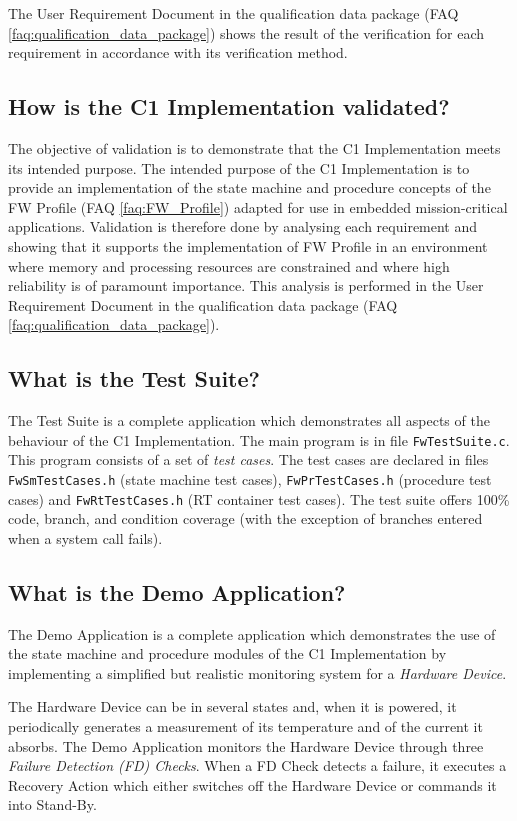 \documentclass[faq]{../fwprofile}
\begin{document}
The User Requirement Document in the qualification data package (FAQ \ref{faq:qualification_data_package}) shows 
the result of the verification for each requirement in accordance with its verification method. 

\subsection{How is the C1 Implementation validated?}
The objective of validation is to demonstrate that the C1 Implementation meets its intended purpose. The intended purpose of the C1 Implementation 
is to provide an implementation of the state machine and procedure concepts of the FW Profile (FAQ \ref{faq:FW_Profile}) adapted for use in 
embedded mission-critical applications. Validation is therefore done by analysing each requirement and showing that it supports the implementation 
of FW Profile in an environment where memory and processing resources are constrained and where high reliability is of paramount importance. 
This analysis is performed in the User Requirement Document in the qualification data package (FAQ \ref{faq:qualification_data_package}).

\subsection{What is the Test Suite?}\label{faq:test_suite}
The Test Suite is a complete application which demonstrates all aspects of the behaviour of the C1 Implementation. 
The main program is in file \texttt{FwTestSuite.c}. This program consists of a set of \emph{test cases}. The test cases are declared 
in files \texttt{FwSmTestCases.h} (state machine test cases), \texttt{FwPrTestCases.h} (procedure test cases) and \texttt{FwRtTestCases.h} (RT container test cases). The test suite offers 100\% code, branch, and condition coverage (with the exception of branches entered when a system call fails). 


\subsection{What is the Demo Application?}\label{faq:demo_application}
The Demo Application is a complete application which demonstrates the use of the state machine and procedure modules of the C1 Implementation by implementing a simplified but realistic monitoring system for a \emph{Hardware Device}.

The Hardware Device can be in several states and, when it is powered, it periodically generates a measurement of its temperature and of the current it absorbs. The Demo Application monitors the Hardware Device through three \emph{Failure Detection (FD) Checks}. When a FD Check detects a failure, it executes a Recovery Action which either switches off the Hardware Device or commands it into Stand-By. 
\end{document}
